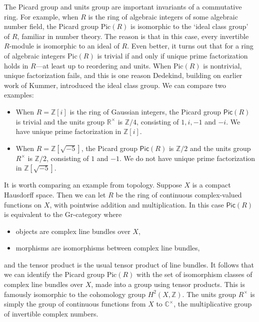 \documentclass[reqno]{amsart}
\newcommand{\Pic}{\mathsf{Pic}}
\newcommand{\Z}{{\mathbb Z}}  %
\newcommand{\R}{{\mathbb R}}  %
\newcommand{\C}{{\mathbb C}}  %
\theoremstyle{definition}
\begin{document}
The Picard group and units group are important invariants of a commutative
ring.  For example, when $R$ is the ring of algebraic integers of some algebraic number field, the Picard group $\mathrm{Pic}(R)$ is isomorphic to the `ideal class group' of $R$, familiar in number theory.  The reason is that in this case, every invertible $R$-module is isomorphic to an ideal of $R$.  Even better, it turns  out that for a ring of algebraic integers $\mathrm{Pic}(R)$ is trivial if and only if unique prime factorization holds in $R$---at least up to reordering and units.   When $\mathrm{Pic}(R)$ is nontrivial, unique factorization fails, and this is one reason Dedekind, building on earlier work of Kummer, introduced the ideal class group.  We can compare two examples:

\begin{itemize}
\item
When $R = \Z[i]$ is the ring of Gaussian integers, the Picard group 
$\Pic(R)$ is trivial and the units group $\R^\times$ is $\Z/4$, consisting of
$1, i, -1$ and $-i$.  We have unique prime factorization in $\Z[i]$.
\item
When $R = \Z[\sqrt{-5}]$, the Picard group $\Pic(R)$ is $\Z/2$ and the
units group $R^\times$ is $\Z/2$, consisting of $1$ and $-1$.  We do not have
unique prime factorization in $\Z[\sqrt{-5}]$.
\end{itemize}

It is worth comparing an example from topology.  Suppose $X$ is a compact Hausdorff space.  Then we can let $R$ be the ring of continuous complex-valued functions on $X$, with pointwise addition and multiplication.  In this case $\Pic(R)$ is equivalent to the Gr-category where
\begin{itemize}
\item objects are complex line bundles over $X$,
\item morphisms are isomorphisms between complex line bundles,
\end{itemize}
and the tensor product is the usual tensor product of line bundles.
It follows that we can identify the Picard group $\mathrm{Pic}(R)$ with the set of
isomorphism classes of complex line bundles over $X$, made into a group using
tensor products.   This is famously isomorphic to the cohomology group $H^2(X,\Z)$.  The units group $R^\times$ is simply the group of continuous functions from $X$ to $\C^\times$, the multiplicative group of invertible complex numbers. 
\end{document}
